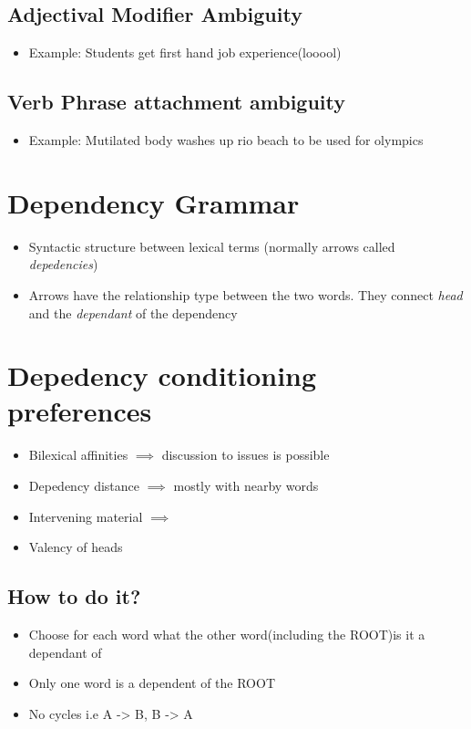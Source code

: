 \documentclass[a4paper]{article}
\begin{document}
\subsection{Adjectival Modifier Ambiguity}
\begin{itemize}
    \item Example: Students get first hand job experience(looool)
\end{itemize}
\subsection{Verb Phrase attachment ambiguity}
\begin{itemize}
    \item Example: Mutilated body washes up rio beach to be used for olympics
\end{itemize}
\section{Dependency Grammar}
\begin{itemize}
    \item Syntactic structure between lexical terms (normally arrows called \textit{depedencies}) 
    \item Arrows have the relationship type between the two words. They connect \textit{head} and the \textit{dependant} of the dependency
\end{itemize}
\section{Depedency conditioning preferences}
\begin{itemize}
    \item Bilexical affinities $\implies$ discussion to issues is possible
    \item Depedency distance $\implies$ mostly with nearby words
    \item Intervening material $\implies$ 
    \item Valency of heads
\end{itemize}
\subsection{How to do it?}
\begin{itemize}
    \item Choose for each word what the other word(including the ROOT)is it a dependant of
    \item Only one word is a dependent of the ROOT
    \item No cycles i.e A -> B, B -> A
\end{itemize}
\end{document}
